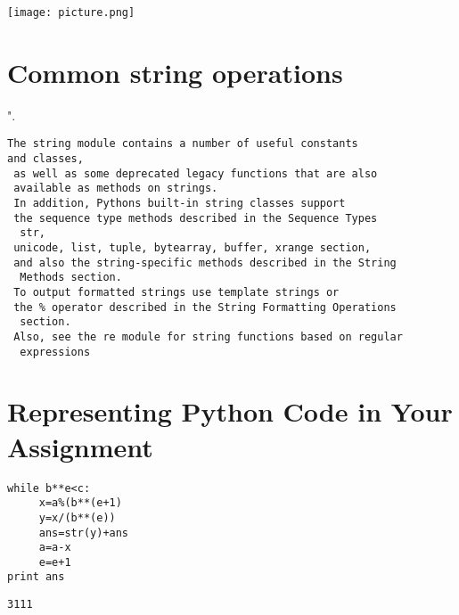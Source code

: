 \begin{marginfigure}%
  \texttt{[image: picture.png]}

\end{marginfigure}


\normalsize

\vspace{1cm}
\section{ Common string operations}

".


\begin{shaded}
\begin{verbatim}
The string module contains a number of useful constants
and classes,
 as well as some deprecated legacy functions that are also
 available as methods on strings.
 In addition, Pythons built-in string classes support 
 the sequence type methods described in the Sequence Types 
  str,
 unicode, list, tuple, bytearray, buffer, xrange section,
 and also the string-specific methods described in the String
  Methods section.
 To output formatted strings use template strings or 
 the % operator described in the String Formatting Operations
  section.
 Also, see the re module for string functions based on regular
  expressions
\end{verbatim}
\end{shaded}

\vspace{1cm}

\section{Representing Python Code in Your Assignment}


\begin{framed}
\begin{verbatim}
while b**e<c:
     x=a%(b**(e+1)
     y=x/(b**(e))
     ans=str(y)+ans
     a=a-x
     e=e+1
print ans

\end{verbatim}
\end{framed}

\marginnote[40pt]

\begin{shaded}
\begin{verbatim}
3111
\end{verbatim}
\end{shaded}
